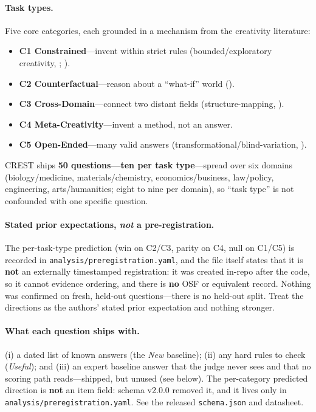 \paragraph{Task types.} Five core categories, each grounded in a mechanism from the creativity
literature:
\begin{itemize}
  \item \textbf{C1 Constrained}---invent within strict rules (bounded/exploratory creativity,
    \citealp{boden2004creative}; \citealp{simonton2003constrained}).
  \item \textbf{C2 Counterfactual}---reason about a ``what-if'' world
    (\citealp{byrne2005rational}).
  \item \textbf{C3 Cross-Domain}---connect two distant fields (structure-mapping,
    \citealp{gentner1983structure,falkenhainer1989sme}).
  \item \textbf{C4 Meta-Creativity}---invent a method, not an answer.
  \item \textbf{C5 Open-Ended}---many valid answers (transformational/blind-variation,
    \citealp{boden2004creative,campbell1960blind}).
\end{itemize}
CREST ships \textbf{50 questions---ten per task type}---spread over six domains (biology/medicine,
materials/chemistry, economics/business, law/policy, engineering, arts/humanities; eight to nine
per domain), so ``task type'' is not confounded with one specific question.

\paragraph{Stated prior expectations, \emph{not} a pre-registration.} The per-task-type prediction
(win on C2/C3, parity on C4, null on C1/C5) is recorded in
\texttt{analysis/preregistration.yaml}, and the file itself states that it is \textbf{not} an
externally timestamped registration: it was created in-repo after the code, so it cannot evidence
ordering, and there is \textbf{no} OSF or equivalent record. Nothing was confirmed on fresh,
held-out questions---there is no held-out split. Treat the directions as the authors' stated prior
expectation and nothing stronger.

\paragraph{What each question ships with.} (i) a dated list of known answers (the \emph{New}
baseline); (ii) any hard rules to check (\emph{Useful}); and (iii) an expert baseline answer that the
judge never sees and that no scoring path reads---shipped, but unused (see below). The per-category predicted direction is \textbf{not} an
item field: schema v2.0.0 removed it, and it lives only in
\texttt{analysis/preregistration.yaml}. See the released \texttt{schema.json} and datasheet.

